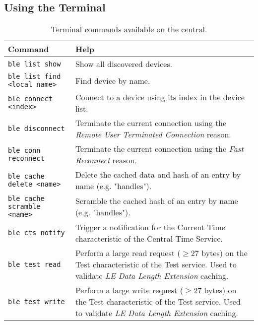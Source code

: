 \subsection{Using the Terminal}
\label{sec:using_terminal}
\begin{table}[H]
    \centering
    \begin{tabular}{|l|p{6cm}|}
    \hline
    \textbf{Command}  & \textbf{Help} \\
    \hline 
    \texttt{ble list show} & Show all discovered devices. \\ \hline
    \texttt{ble list find <local name>}  & Find device by name. \\ \hline
    \texttt{ble connect <index>} & Connect to a device using its index in the device list. \\ \hline
    \texttt{ble disconnect} & Terminate the current connection using the \textit{Remote User Terminated Connection} reason. \\ \hline
    \texttt{ble conn reconnect} & Terminate the current connection using the \textit{Fast Reconnect} reason. \\ \hline
    \texttt{ble cache delete <name>} & Delete the cached data and hash of an entry by name (e.g. "handles"). \\ \hline
    \texttt{ble cache scramble <name>} & Scramble the cached hash of an entry by name (e.g. "handles").  \\ \hline
    \texttt{ble cts notify} & Trigger a notification for the Current Time characteristic of the Central Time Service. \\ \hline
    \texttt{ble test read} & Perform a large read request ($\geq 27$ bytes) on the Test characteristic of the Test service. Used to validate \textit{LE Data Length Extension} caching. \\ \hline
    \texttt{ble test write} & Perform a large write request ($\geq 27$ bytes) on the Test characteristic of the Test service. Used to validate \textit{LE Data Length Extension} caching. \\ \hline
    \end{tabular}
    \caption{Terminal commands available on the central.}
    \label{tbl:demo_commands}
\end{table}

